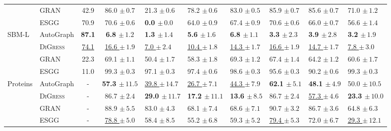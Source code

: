 \begin{tabular}{llccp{1.6cm}p{1.6cm}p{1.6cm}p{1.6cm}p{1.6cm}p{1.6cm}}
 & GRAN & 42.9 & 86.0 $\pm\,\scriptstyle{0.7}$ & 21.3 $\pm\,\scriptstyle{0.6}$ & 78.2 $\pm\,\scriptstyle{0.6}$ & 83.0 $\pm\,\scriptstyle{0.5}$ & 85.9 $\pm\,\scriptstyle{0.7}$ & 85.6 $\pm\,\scriptstyle{0.7}$ & 71.0 $\pm\,\scriptstyle{1.2}$ \\
 & ESGG & 70.9 & 70.6 $\pm\,\scriptstyle{0.6}$ & \textbf{0.0 $\pm\,\scriptstyle{0.0}$} & 64.0 $\pm\,\scriptstyle{0.9}$ & 67.4 $\pm\,\scriptstyle{0.9}$ & 70.6 $\pm\,\scriptstyle{0.6}$ & 66.0 $\pm\,\scriptstyle{0.7}$ & 56.6 $\pm\,\scriptstyle{1.4}$ \\
\midrule
\textsc{SBM-L} & AutoGraph & \textbf{87.1} & \textbf{6.8 $\pm\,\scriptstyle{1.2}$} & \textbf{1.3 $\pm\,\scriptstyle{1.4}$} & \textbf{5.6 $\pm\,\scriptstyle{1.6}$} & \textbf{6.8 $\pm\,\scriptstyle{1.1}$} & \textbf{3.3 $\pm\,\scriptstyle{2.3}$} & \textbf{3.9 $\pm\,\scriptstyle{2.8}$} & \textbf{3.2 $\pm\,\scriptstyle{1.9}$} \\
 & \textsc{DiGress} & \underline{74.1} & \underline{16.6 $\pm\,\scriptstyle{1.9}$} & \underline{7.0 $\pm\,\scriptstyle{2.4}$} & \underline{10.4 $\pm\,\scriptstyle{1.8}$} & \underline{14.3 $\pm\,\scriptstyle{1.7}$} & \underline{16.6 $\pm\,\scriptstyle{1.9}$} & \underline{14.7 $\pm\,\scriptstyle{1.7}$} & \underline{7.8 $\pm\,\scriptstyle{3.0}$} \\
 & GRAN & 22.3 & 69.1 $\pm\,\scriptstyle{1.1}$ & 50.4 $\pm\,\scriptstyle{1.7}$ & 58.3 $\pm\,\scriptstyle{1.8}$ & 69.3 $\pm\,\scriptstyle{1.2}$ & 67.4 $\pm\,\scriptstyle{1.4}$ & 64.2 $\pm\,\scriptstyle{1.2}$ & 60.6 $\pm\,\scriptstyle{1.7}$ \\
 & ESGG & 11.0 & 99.3 $\pm\,\scriptstyle{0.3}$ & 97.1 $\pm\,\scriptstyle{0.3}$ & 97.4 $\pm\,\scriptstyle{0.6}$ & 98.6 $\pm\,\scriptstyle{0.3}$ & 95.6 $\pm\,\scriptstyle{0.3}$ & 90.2 $\pm\,\scriptstyle{0.6}$ & 99.3 $\pm\,\scriptstyle{0.3}$ \\
\midrule
Proteins & AutoGraph & - & \textbf{57.3 $\pm\,\scriptstyle{11.5}$} & \underline{39.8 $\pm\,\scriptstyle{14.7}$} & \underline{26.7 $\pm\,\scriptstyle{7.1}$} & \underline{44.3 $\pm\,\scriptstyle{7.9}$} & \textbf{62.1 $\pm\,\scriptstyle{5.1}$} & \textbf{48.1 $\pm\,\scriptstyle{4.9}$} & 50.0 $\pm\,\scriptstyle{10.5}$ \\
 & \textsc{DiGress} & - & 86.7 $\pm\,\scriptstyle{2.4}$ & \textbf{29.0 $\pm\,\scriptstyle{11.7}$} & \textbf{17.2 $\pm\,\scriptstyle{11.1}$} & \textbf{13.6 $\pm\,\scriptstyle{8.5}$} & 86.7 $\pm\,\scriptstyle{2.4}$ & \underline{57.3 $\pm\,\scriptstyle{4.6}$} & \textbf{23.3 $\pm\,\scriptstyle{10.0}$} \\
 & GRAN & - & 88.9 $\pm\,\scriptstyle{5.5}$ & 83.0 $\pm\,\scriptstyle{4.3}$ & 68.1 $\pm\,\scriptstyle{7.4}$ & 68.6 $\pm\,\scriptstyle{7.1}$ & 90.7 $\pm\,\scriptstyle{3.2}$ & 86.7 $\pm\,\scriptstyle{3.6}$ & 64.8 $\pm\,\scriptstyle{6.3}$ \\
 & ESGG & - & \underline{78.8 $\pm\,\scriptstyle{5.0}$} & 58.4 $\pm\,\scriptstyle{8.5}$ & 55.2 $\pm\,\scriptstyle{6.8}$ & 59.3 $\pm\,\scriptstyle{5.2}$ & \underline{79.4 $\pm\,\scriptstyle{5.3}$} & 72.0 $\pm\,\scriptstyle{6.7}$ & \underline{29.3 $\pm\,\scriptstyle{12.1}$} \\
\bottomrule
\end{tabular}